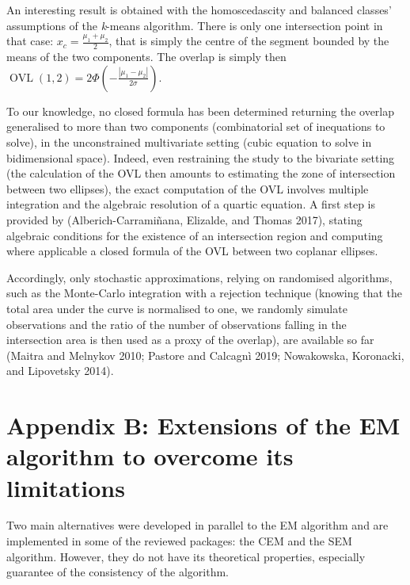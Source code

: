 An interesting result is obtained with the homoscedascity and balanced
classes' assumptions of the \emph{k}-means algorithm. There is only one
intersection point in that case: \(x_c= \frac{\mu_1 + \mu_2}{2}\), that is
simply the centre of the segment bounded by the means of the two
components. The overlap is simply then
\(\operatorname{OVL} (1, 2) = 2 \Phi (- \frac{|\mu_1 - \mu_2|}{2\sigma})\).

To our knowledge, no closed formula has been determined returning the overlap generalised to more than two components (combinatorial set of inequations to solve), in the unconstrained multivariate setting (cubic equation to solve in bidimensional space). Indeed, even restraining the study to the bivariate setting (the calculation of the OVL then amounts to estimating the zone of intersection between two ellipses), the exact computation of the OVL involves multiple integration and the algebraic resolution of a quartic equation. A first step is provided by (Alberich-Carramiñana, Elizalde, and Thomas 2017), stating algebraic conditions for the existence of an intersection region and computing where applicable a closed formula of the OVL between two coplanar ellipses.

Accordingly, only stochastic approximations, relying on randomised algorithms, such as the Monte-Carlo integration with a rejection technique (knowing that the total area under the curve is normalised to one, we randomly simulate observations and the ratio of the number of observations falling in the intersection area is then used as a proxy of the overlap), are available so far (Maitra and Melnykov 2010; Pastore and Calcagnì 2019; Nowakowska, Koronacki, and Lipovetsky 2014).

\hypertarget{appendix-b-extensions-of-the-em-algorithm-to-overcome-its-limitations}{%
\section{Appendix B: Extensions of the EM algorithm to overcome its limitations}\label{appendix-b-extensions-of-the-em-algorithm-to-overcome-its-limitations}}

Two main alternatives were developed in parallel to the EM algorithm and
are implemented in some of the reviewed packages: the CEM and the SEM
algorithm. However, they do not have its theoretical properties,
especially guarantee of the consistency of the algorithm.

